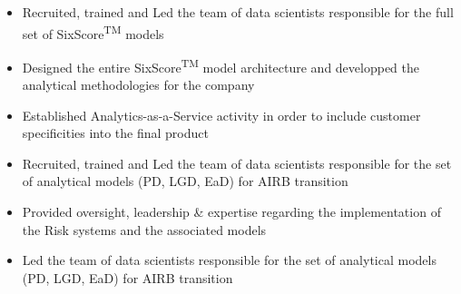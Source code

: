 \documentclass[10pt,a4paper]{altacv}
\begin{document}

\begin{fullwidth}
\makecvheader
\end{fullwidth}


\begin{itemize}
\item Recruited, trained and Led the team of data scientists responsible for the full set of Six\textdegree Score\textsuperscript{TM} models
\item Designed the entire Six\textdegree Score\textsuperscript{TM} model architecture and developped the analytical methodologies for the company
\item Established Analytics-as-a-Service activity in order to include customer specificities into the final product
\end{itemize}

\divider

\begin{itemize}
\item Recruited, trained and Led the team of data scientists responsible for the set of analytical models (PD, LGD, EaD) for AIRB transition
\item Provided oversight, leadership \& expertise regarding the implementation of the Risk systems and the associated models
\end{itemize}

\divider

\begin{itemize}
\item Led the team of data scientists responsible for the set of analytical models (PD, LGD, EaD) for AIRB transition
\end{itemize}
\end{document}
